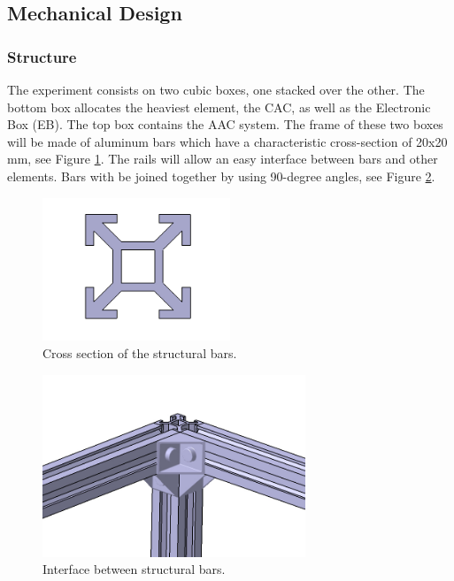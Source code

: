 \pagebreak
\subsection{Mechanical Design} \label{Mechanical_Design}


\subsubsection{Structure}

The experiment consists on two cubic boxes, one stacked over the other. The bottom box allocates the heaviest element, the CAC, as well as the Electronic Box (EB). The top box contains the AAC system. The frame of these two boxes will be made of aluminum bars which have a characteristic cross-section of 20x20 mm, see Figure \ref{cross-section}. The rails will allow an easy interface between bars and other elements. Bars with be joined together by using 90-degree angles, see Figure \ref{3_bars_joined}.


\begin{figure}[!ht]
    \centering
    \includegraphics[width=0.5\textwidth]{4-experiment-design/img/1_cross_section.jpg}
    \caption{Cross section of the structural bars.}
    \label{cross-section}
\end{figure}


\begin{figure}[!ht]
    \centering
    \includegraphics[width=0.7\textwidth]{4-experiment-design/img/bars_joint.jpg}
    \caption{Interface between structural bars.}
    \label{3_bars_joined}
\end{figure}

